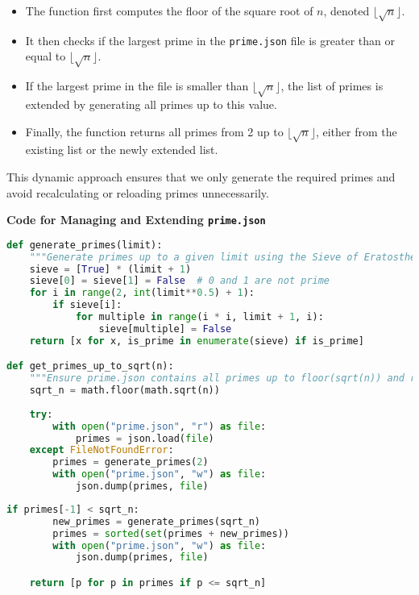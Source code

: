 \documentclass[12pt]{report}
\begin{document}
\begin{itemize}
    \item The function first computes the floor of the square root of $n$, denoted $\lfloor \sqrt{n} \rfloor$.
    \item It then checks if the largest prime in the \texttt{prime.json} file is greater than or equal to $\lfloor \sqrt{n} \rfloor$.
    \item If the largest prime in the file is smaller than $\lfloor \sqrt{n} \rfloor$, the list of primes is extended by generating all primes up to this value.
    \item Finally, the function returns all primes from 2 up to $\lfloor \sqrt{n} \rfloor$, either from the existing list or the newly extended list.
\end{itemize}

This dynamic approach ensures that we only generate the required primes and avoid recalculating or reloading primes unnecessarily.

\begin{center}
    \textbf{Code for Managing and Extending \texttt{prime.json}} 
\end{center}


\begin{lstlisting}[language=Python]
def generate_primes(limit):
    """Generate primes up to a given limit using the Sieve of Eratosthenes."""
    sieve = [True] * (limit + 1)
    sieve[0] = sieve[1] = False  # 0 and 1 are not prime
    for i in range(2, int(limit**0.5) + 1):
        if sieve[i]:
            for multiple in range(i * i, limit + 1, i):
                sieve[multiple] = False
    return [x for x, is_prime in enumerate(sieve) if is_prime]

def get_primes_up_to_sqrt(n):
    """Ensure prime.json contains all primes up to floor(sqrt(n)) and return the list of primes up to floor(sqrt(n))."""
    sqrt_n = math.floor(math.sqrt(n))
    
    try:
        with open("prime.json", "r") as file:
            primes = json.load(file)
    except FileNotFoundError:
        primes = generate_primes(2)
        with open("prime.json", "w") as file:
            json.dump(primes, file)
\end{lstlisting}

\clearpage

\begin{lstlisting}[language=Python]
    if primes[-1] < sqrt_n:
        new_primes = generate_primes(sqrt_n)
        primes = sorted(set(primes + new_primes))
        with open("prime.json", "w") as file:
            json.dump(primes, file)

    return [p for p in primes if p <= sqrt_n]
\end{lstlisting}
\end{document}
